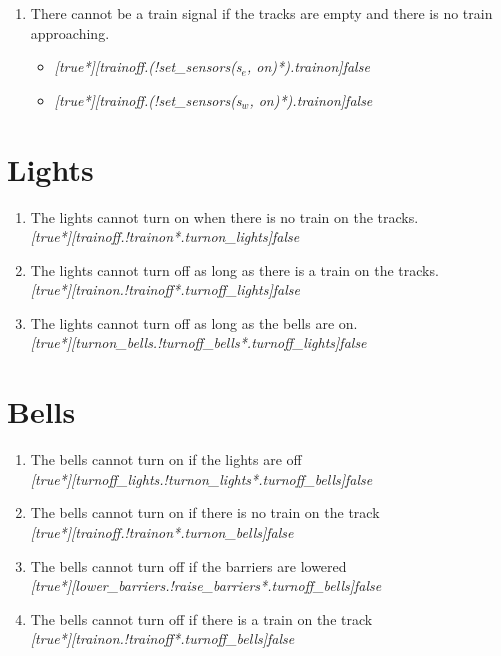 \documentclass[final]{report}
\begin{document}
\begin{enumerate}
\item There cannot be a train signal if the tracks are empty and there is no train approaching.
\begin{itemize}
\item \textit{[true*][trainoff.(!set\_sensors(s$_{e}$, on)*).trainon]false}
\item \textit{[true*][trainoff.(!set\_sensors(s$_{w}$, on)*).trainon]false}
\end{itemize}

\end{enumerate}
\section{Lights}

\begin{enumerate}
\item The lights cannot turn on when there is no train on the tracks.\\
\textit{[true*][trainoff.!trainon*.turnon\_lights]false}

\item The lights cannot turn off as long as there is a train on the tracks.\\
\textit{[true*][trainon.!trainoff*.turnoff\_lights]false}

\item The lights cannot turn off as long as the bells are on.\\
\textit{[true*][turnon\_bells.!turnoff\_bells*.turnoff\_lights]false}
\end{enumerate}

\section{Bells}
\begin{enumerate}
\item The bells cannot turn on if the lights are off\\
\textit{[true*][turnoff\_lights.!turnon\_lights*.turnoff\_bells]false}
\item The bells cannot turn on if there is no train on the track\\
\textit{[true*][trainoff.!trainon*.turnon\_bells]false}
\item The bells cannot turn off if the barriers are lowered\\
\textit{[true*][lower\_barriers.!raise\_barriers*.turnoff\_bells]false}
\item The bells cannot turn off if there is a train on the track\\
\textit{[true*][trainon.!trainoff*.turnoff\_bells]false}
\end{enumerate}
\end{document}
